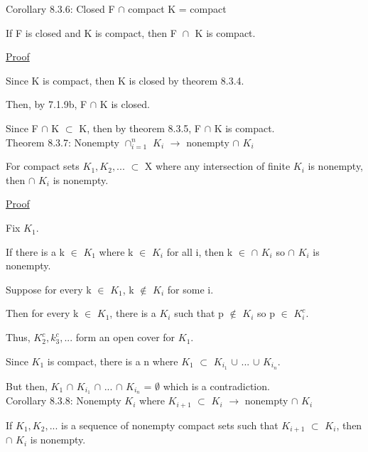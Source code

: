 { \color{orange} Corollary 8.3.6: Closed F $\cap$ compact K = compact } 

	\begin{adjustbox}{minipage=14cm, right, vspace=0.1cm 0cm}
		If F is closed and K is compact, then F $\cap_{}^{}$ K is compact.
	\end{adjustbox}

{ \color{magenta} \underline{Proof} } 

	Since K is compact, then K is closed by {\color{red} theorem 8.3.4}.

	Then, by {\color{red} 7.1.9b}, F $\cap$ K is closed.

	Since F $\cap$ K $\subset$ K, then by {\color{red} theorem 8.3.5},
	F $\cap$ K is compact. \\

{ \color{red} Theorem 8.3.7: Nonempty $\cap_{i=1}^n$ $K_i$ $\rightarrow$
nonempty $\cap$ $K_i$ } 

	\begin{adjustbox}{minipage=14cm, right, vspace=0.1cm 0cm}
		For compact sets $K_1, K_2, ...$ $\subset$ X where any intersection
		of finite $K_i$ is nonempty, then $\cap$ $K_i$ is nonempty.
	\end{adjustbox}

{ \color{magenta} \underline{Proof} } 

	Fix $K_1$.

	If there is a k $\in$ $K_1$ where k $\in$ $K_i$ for all i, then
	k $\in$ $\cap$ $K_i$ so $\cap$ $K_i$ is nonempty.

	Suppose for every k $\in$ $K_1$, k $\not \in$ $K_i$ for some i.

	Then for every k $\in$ $K_1$, there is a $K_i$ such that
	p $\not \in$ $K_i$ so p $\in$ $K_i^c$.

	Thus, $K_2^c, k_3^c, ...$ form an open cover for $K_1$.

	Since $K_1$ is compact, there is a n where
	$K_1$ $\subset$ $K_{i_1}$ $\cup$ ... $\cup$ $K_{i_n}$.

	But then, $K_1$ $\cap$ $K_{i_1}$ $\cap$ ... $\cap$ $K_{i_n}$
	= $\emptyset$ which is a contradiction. \\

{ \color{orange} Corollary 8.3.8: Nonempty $K_i$ where $K_{i+1}$ $\subset$ $K_i$
$\rightarrow$ nonempty $\cap$ $K_i$}

	\begin{adjustbox}{minipage=14cm, right, vspace=0.1cm 0cm}
		If $K_1, K_2, ...$ is a sequence of nonempty compact sets
		such that $K_{i+1}$ $\subset$ $K_i$, then $\cap$ $K_i$ is nonempty.
	\end{adjustbox}

